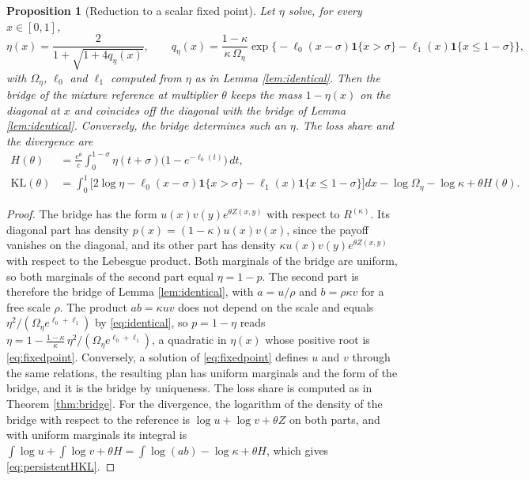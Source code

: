\documentclass[11pt,a4paper]{article}
\theoremstyle{notesplain}
\newtheorem{proposition}[theorem]{Proposition}
\theoremstyle{notesupright}
\numberwithin{equation}{section}
\newcommand{\KL}{\mathrm{KL}}
\begin{document}
\begin{proposition}[Reduction to a scalar fixed point]
\label{prop:reduction}
Let $\eta$ solve, for every $x\in[0,1]$,
\begin{equation}
\eta(x)=\frac2{1+\sqrt{1+4q_\eta(x)}},\qquad q_\eta(x)=\frac{1-\kappa}{\kappa\,\Omega_\eta}\exp\big\{-\ell_0(x-\sigma)\mathbf 1\{x>\sigma\}-\ell_1(x)\mathbf 1\{x\le1-\sigma\}\big\},
\label{eq:fixedpoint}
\end{equation}
with $\Omega_\eta$, $\ell_0$ and $\ell_1$ computed from $\eta$ as in Lemma \ref{lem:identical}. Then the bridge of the mixture reference at multiplier $\theta$ keeps the mass $1-\eta(x)$ on the diagonal at $x$ and coincides off the diagonal with the bridge of Lemma \ref{lem:identical}. Conversely, the bridge determines such an $\eta$. The loss share and the divergence are
\begin{equation}
\begin{aligned}
H(\theta)&=\frac{e^\theta}c\int_0^{1-\sigma}\eta(t+\sigma)\big(1-e^{-\ell_0(t)}\big)\,dt,\\
\KL(\theta)&=\int_0^1\big[2\log\eta-\ell_0(x-\sigma)\mathbf 1\{x>\sigma\}-\ell_1(x)\mathbf 1\{x\le1-\sigma\}\big]dx-\log\Omega_\eta-\log\kappa+\theta H(\theta).
\end{aligned}
\label{eq:persistentHKL}
\end{equation}
\end{proposition}

\begin{proof}
The bridge has the form $u(x)v(y)e^{\theta Z(x,y)}$ with respect to $R^{(\kappa)}$. Its diagonal part has density $p(x)=(1-\kappa)u(x)v(x)$, since the payoff vanishes on the diagonal, and its other part has density $\kappa u(x)v(y)e^{\theta Z(x,y)}$ with respect to the Lebesgue product. Both marginals of the bridge are uniform, so both marginals of the second part equal $\eta=1-p$. The second part is therefore the bridge of Lemma \ref{lem:identical}, with $a=u/\rho$ and $b=\rho\kappa v$ for a free scale $\rho$. The product $ab=\kappa uv$ does not depend on the scale and equals $\eta^2/(\Omega_\eta e^{\ell_0+\ell_1})$ by \eqref{eq:identical}, so $p=1-\eta$ reads $\eta=1-\frac{1-\kappa}\kappa\,\eta^2/(\Omega_\eta e^{\ell_0+\ell_1})$, a quadratic in $\eta(x)$ whose positive root is \eqref{eq:fixedpoint}. Conversely, a solution of \eqref{eq:fixedpoint} defines $u$ and $v$ through the same relations, the resulting plan has uniform marginals and the form of the bridge, and it is the bridge by uniqueness. The loss share is computed as in Theorem \ref{thm:bridge}. For the divergence, the logarithm of the density of the bridge with respect to the reference is $\log u+\log v+\theta Z$ on both parts, and with uniform marginals its integral is $\int\log u+\int\log v+\theta H=\int\log(ab)-\log\kappa+\theta H$, which gives \eqref{eq:persistentHKL}.
\end{proof}
\end{document}
